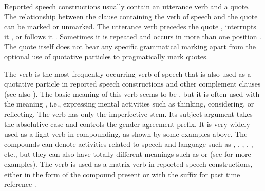 Reported speech constructions usually contain an utterance verb and a quote. The relationship between the clause containing the verb of speech and the quote can be marked or unmarked. The utterance verb precedes the quote , interrupts it , or follows it . Sometimes it is repeated and occurs in more than one position . The quote itself does not bear any specific grammatical marking apart from the optional use of quotative particles to pragmatically mark quotes.

The verb  is the most frequently occurring verb of speech that is also used as a quotative particle in reported speech constructions and other complement clauses (see also ). The basic meaning of this verb seems to be , but it is often used with the meaning , i.e., expressing mental activities such as thinking, considering, or reflecting. The verb has only the imperfective stem. Its subject argument takes the absolutive case and controls the gender agreement prefix. It is very widely used as a light verb in compounding, as shown by some examples above. The compounds can denote activities related to speech and language such as  ,  ,  ,  ,  , etc., but they can also have totally different meanings such as   or   (see  for more examples). The verb is used as a matrix verb in reported speech constructions, either in the form of the compound present  or with the suffix  for past time reference .
%
